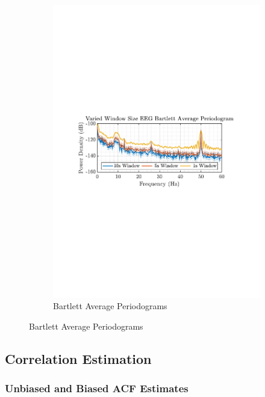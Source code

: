 \documentclass[12pt]{article}
\begin{document}
\begin{figure}[H]
\begin{subfigure}{0.49\textwidth}
			\includegraphics[trim={2.2cm 11.2cm 3.15cm  11.2cm}, clip, width=\textwidth]{../MATLAB/figures/q1_2b_fig02.pdf} 
			\captionsetup{justification=centering}
			\caption{Bartlett Average Periodograms}
		\end{subfigure}
		\label{fig: 1-2b}
	\end{figure}

	\subsection{Correlation Estimation} \label{sec: 1-3-correlation-est}
	
	\subsubsection{Unbiased and Biased ACF Estimates}
	
\end{document}
